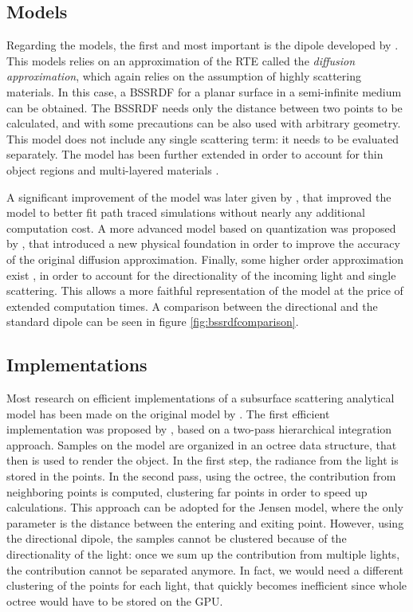 \subsection{Models}
Regarding the models, the first and most important is the dipole developed by \cite{Jensen:2001:PMS:383259.383319}. This models relies on an approximation of the RTE called the \emph{diffusion approximation}, which again relies on the assumption of highly scattering materials. In this case, a BSSRDF for a planar surface in a semi-infinite medium can be obtained. The BSSRDF needs only the distance between two points to be calculated, and with some precautions can be also used with arbitrary geometry. This model does not include any single scattering term: it needs to be evaluated separately. The model has been further extended in order to account for thin object regions and multi-layered materials \citep{Donner:2005:LDM:1186822.1073308}.

A significant improvement of the model was later given by \cite{deondeon}, that improved the model to better fit path traced simulations without nearly any additional computation cost. A more advanced model based on quantization was proposed by \cite{D'Eon:2011:QMR:1964921.1964951}, that introduced a new physical foundation in order to improve the accuracy of the original diffusion approximation. Finally, some higher order approximation exist \citep{PhysRevLett.94.153904, IMM2013-06646}, in order to account for the directionality of the incoming light and single scattering. This allows a more faithful representation of the model at the price of extended computation times. A comparison between the directional and the standard dipole can be seen in figure \ref{fig:bssrdfcomparison}.


\subsection{Implementations}

Most research on efficient implementations of a subsurface scattering analytical model has been made on the original model by \cite{Jensen:2001:PMS:383259.383319}. The first efficient implementation was proposed by \cite{Jensen:2002:RHR:566654.566619}, based on a two-pass hierarchical integration approach. Samples on the model are organized in an octree data structure, that then is used to render the object. In the first step, the radiance from the light is stored in the points. In the second pass, using the octree, the contribution from neighboring points is computed, clustering far points in order to speed up calculations. This approach can be adopted for the Jensen model, where the only parameter is the distance between the entering and exiting point. However, using the directional dipole, the samples cannot be clustered because of the directionality of the light: once we sum up the contribution from multiple lights, the contribution cannot be separated anymore. In fact, we would need a different clustering of the points for each light, that quickly becomes inefficient since whole octree would have to be stored on the GPU. 

